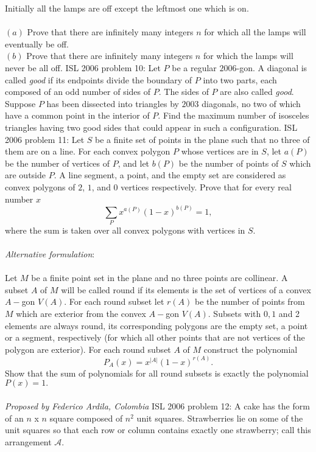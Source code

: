 Initially all the lamps are off except the leftmost one which is on. \\\\
$ (a)$ Prove that there are infinitely many integers $ n$ for which all the lamps will eventually be off. \\
$ (b)$ Prove that there are infinitely many integers $ n$ for which the lamps will never be all off. 
ISL 2006 problem 10:  Let $P$ be a regular $2006$-gon. A diagonal is called \textit{good} if its endpoints divide the boundary of $P$ into two parts, each composed of an odd number of sides of $P$. The sides of $P$ are also called \textit{good}. \\
Suppose $P$ has been dissected into triangles by $2003$ diagonals, no two of which have a common point in the interior of $P$. Find the maximum number of isosceles triangles having two good sides that could appear in such a configuration. 
ISL 2006 problem 11:  Let $ S$ be a finite set of points in the plane such that no three of them are on a line. For each convex polygon $ P$ whose vertices are in $ S$, let $ a(P)$ be the number of vertices of $ P$, and let $ b(P)$ be the number of points of $ S$ which are outside $ P$. A line segment, a point, and the empty set are considered as convex polygons of $ 2$, $ 1$, and $ 0$ vertices respectively. Prove that for every real number $ x$
\[ \sum_P{x^{a(P)}(1 - x)^{b(P)}} = 1, \]
where the sum is taken over all convex polygons with vertices in $ S$. \\\\
\textit{Alternative formulation}: \\\\
Let $ M$ be a finite point set in the plane and no three points are collinear. A subset $ A$ of $ M$ will be called round if its elements is the set of vertices of a convex $ A -$gon $ V(A).$ For each round subset let $ r(A)$ be the number of points from $ M$ which are exterior from the convex $ A -$gon $ V(A).$ Subsets with $ 0,1$ and 2 elements are always round, its corresponding polygons are the empty set, a point or a segment, respectively (for which all other points that are not vertices of the polygon are exterior). For each round subset $ A$ of $ M$ construct the polynomial
\[ P_A(x) = x^{|A|}(1 - x)^{r(A)}. \]
Show that the sum of polynomials for all round subsets is exactly the polynomial $ P(x) = 1.$ \\\\
\textit{Proposed by Federico Ardila, Colombia} 
ISL 2006 problem 12:  A cake has the form of an $ n$ x $ n$ square composed of $ n^2$ unit squares. Strawberries lie on some of the unit squares so that each row or column contains exactly one strawberry; call this arrangement $\mathcal{A}$. \\\\
